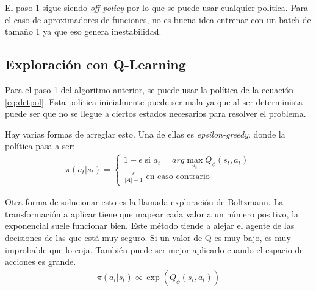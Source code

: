 El paso 1 sigue siendo \textit{off-policy} por lo que se puede usar cualquier política. Para el
caso de aproximadores de funciones, no es buena idea entrenar con un batch de tamaño 1 ya que
eso genera inestabilidad.

\subsection{Exploración con Q-Learning}%
\label{sub:exploración_con_q_learning}

Para el paso 1 del algoritmo anterior, se puede usar la política de la ecuación \ref{eq:detpol}.
Esta política inicialmente puede ser mala ya que al ser determinista puede ser que no
se llegue a ciertos estados necesarios para resolver el problema.

Hay varias formas de arreglar esto. Una de ellas es \textit{epsilon-greedy}, donde la política
pasa a ser:
\begin{align}
    \pi(a_t|s_t)= \begin{cases}
        1-\epsilon \textrm{ si } a_t = arg\max_{a_t} Q_\phi(s_t,a_t)\\
        \frac{\epsilon}{|A|-1} \textrm{ en caso contrario }
    \end{cases}
\end{align}

Otra forma de solucionar esto es la llamada exploración de Boltzmann. La transformación
a aplicar tiene que mapear cada valor a un número positivo, la exponencial suele funcionar
bien. Este método tiende a alejar el agente de las decisiones de las que está muy seguro. Si
un valor de Q es muy bajo, es muy improbable que lo coja. También puede ser mejor aplicarlo
cuando el espacio de acciones es grande.
\begin{align}
    \pi(a_t|s_t)\propto \exp(Q_\phi(s_t,a_t))
\end{align}
